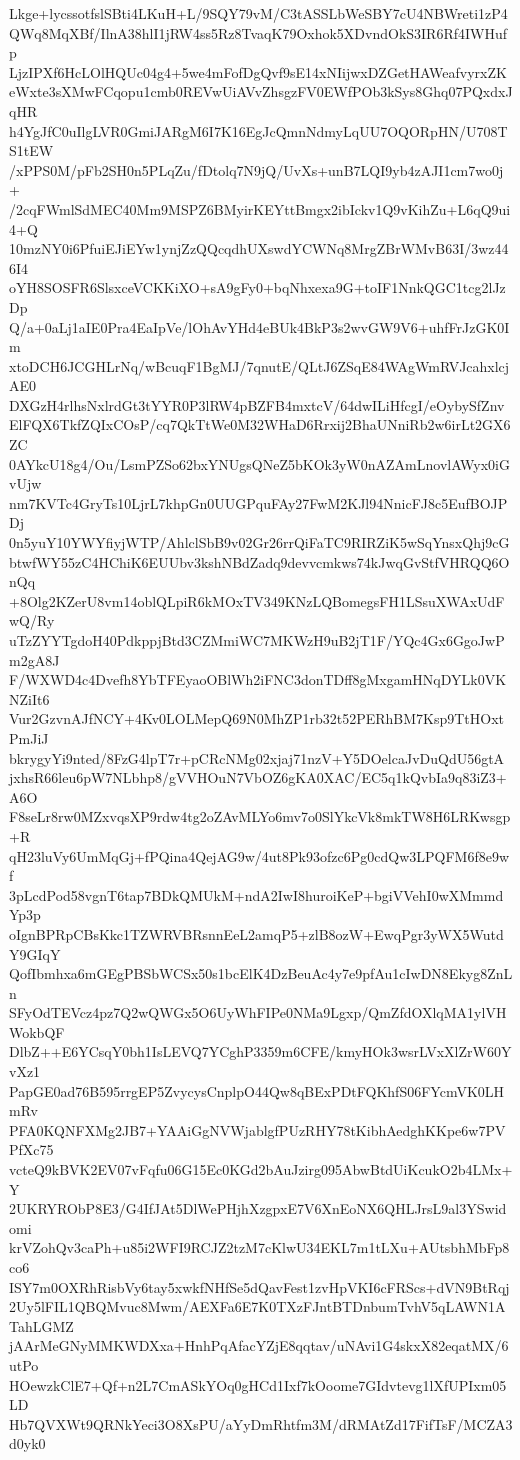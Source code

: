 Lkge+lycssotfslSBti4LKuH+L/9SQY79vM/C3tASSLbWeSBY7cU4NBWreti1zP4
QWq8MqXBf/IlnA38hlI1jRW4ss5Rz8TvaqK79Oxhok5XDvndOkS3IR6Rf4IWHufp
LjzIPXf6HcLOlHQUc04g4+5we4mFofDgQvf9sE14xNIijwxDZGetHAWeafvyrxZK
eWxte3sXMwFCqopu1cmb0REVwUiAVvZhsgzFV0EWfPOb3kSys8Ghq07PQxdxJqHR
h4YgJfC0uIlgLVR0GmiJARgM6I7K16EgJcQmnNdmyLqUU7OQORpHN/U708TS1tEW
/xPPS0M/pFb2SH0n5PLqZu/fDtolq7N9jQ/UvXs+unB7LQI9yb4zAJI1cm7wo0j+
/2cqFWmlSdMEC40Mm9MSPZ6BMyirKEYttBmgx2ibIckv1Q9vKihZu+L6qQ9ui4+Q
10mzNY0i6PfuiEJiEYw1ynjZzQQcqdhUXswdYCWNq8MrgZBrWMvB63I/3wz446I4
oYH8SOSFR6SlsxceVCKKiXO+sA9gFy0+bqNhxexa9G+toIF1NnkQGC1tcg2lJzDp
Q/a+0aLj1aIE0Pra4EaIpVe/lOhAvYHd4eBUk4BkP3s2wvGW9V6+uhfFrJzGK0Im
xtoDCH6JCGHLrNq/wBcuqF1BgMJ/7qnutE/QLtJ6ZSqE84WAgWmRVJcahxlcjAE0
DXGzH4rlhsNxlrdGt3tYYR0P3lRW4pBZFB4mxtcV/64dwILiHfcgI/eOybySfZnv
ElFQX6TkfZQIxCOsP/cq7QkTtWe0M32WHaD6Rrxij2BhaUNniRb2w6irLt2GX6ZC
0AYkcU18g4/Ou/LsmPZSo62bxYNUgsQNeZ5bKOk3yW0nAZAmLnovlAWyx0iGvUjw
nm7KVTc4GryTs10LjrL7khpGn0UUGPquFAy27FwM2KJl94NnicFJ8c5EufBOJPDj
0n5yuY10YWYfiyjWTP/AhlclSbB9v02Gr26rrQiFaTC9RIRZiK5wSqYnsxQhj9cG
btwfWY55zC4HChiK6EUUbv3kshNBdZadq9devvcmkws74kJwqGvStfVHRQQ6OnQq
+8Olg2KZerU8vm14oblQLpiR6kMOxTV349KNzLQBomegsFH1LSsuXWAxUdFwQ/Ry
uTzZYYTgdoH40PdkppjBtd3CZMmiWC7MKWzH9uB2jT1F/YQc4Gx6GgoJwPm2gA8J
F/WXWD4c4Dvefh8YbTFEyaoOBlWh2iFNC3donTDff8gMxgamHNqDYLk0VKNZiIt6
Vur2GzvnAJfNCY+4Kv0LOLMepQ69N0MhZP1rb32t52PERhBM7Ksp9TtHOxtPmJiJ
bkrygyYi9nted/8FzG4lpT7r+pCRcNMg02xjaj71nzV+Y5DOelcaJvDuQdU56gtA
jxhsR66leu6pW7NLbhp8/gVVHOuN7VbOZ6gKA0XAC/EC5q1kQvbIa9q83iZ3+A6O
F8seLr8rw0MZxvqsXP9rdw4tg2oZAvMLYo6mv7o0SlYkcVk8mkTW8H6LRKwsgp+R
qH23luVy6UmMqGj+fPQina4QejAG9w/4ut8Pk93ofzc6Pg0cdQw3LPQFM6f8e9wf
3pLcdPod58vgnT6tap7BDkQMUkM+ndA2IwI8huroiKeP+bgiVVehI0wXMmmdYp3p
oIgnBPRpCBsKkc1TZWRVBRsnnEeL2amqP5+zlB8ozW+EwqPgr3yWX5WutdY9GIqY
QofIbmhxa6mGEgPBSbWCSx50s1bcElK4DzBeuAc4y7e9pfAu1cIwDN8Ekyg8ZnLn
SFyOdTEVcz4pz7Q2wQWGx5O6UyWhFIPe0NMa9Lgxp/QmZfdOXlqMA1ylVHWokbQF
DlbZ++E6YCsqY0bh1IsLEVQ7YCghP3359m6CFE/kmyHOk3wsrLVxXlZrW60YvXz1
PapGE0ad76B595rrgEP5ZvycysCnplpO44Qw8qBExPDtFQKhfS06FYcmVK0LHmRv
PFA0KQNFXMg2JB7+YAAiGgNVWjablgfPUzRHY78tKibhAedghKKpe6w7PVPfXc75
vcteQ9kBVK2EV07vFqfu06G15Ec0KGd2bAuJzirg095AbwBtdUiKcukO2b4LMx+Y
2UKRYRObP8E3/G4IfJAt5DlWePHjhXzgpxE7V6XnEoNX6QHLJrsL9al3YSwidomi
krVZohQv3caPh+u85i2WFI9RCJZ2tzM7cKlwU34EKL7m1tLXu+AUtsbhMbFp8co6
ISY7m0OXRhRisbVy6tay5xwkfNHfSe5dQavFest1zvHpVKI6cFRScs+dVN9BtRqj
2Uy5lFIL1QBQMvuc8Mwm/AEXFa6E7K0TXzFJntBTDnbumTvhV5qLAWN1ATahLGMZ
jAArMeGNyMMKWDXxa+HnhPqAfacYZjE8qqtav/uNAvi1G4skxX82eqatMX/6utPo
HOewzkClE7+Qf+n2L7CmASkYOq0gHCd1Ixf7kOoome7GIdvtevg1lXfUPIxm05LD
Hb7QVXWt9QRNkYeci3O8XsPU/aYyDmRhtfm3M/dRMAtZd17FifTsF/MCZA3d0yk0

